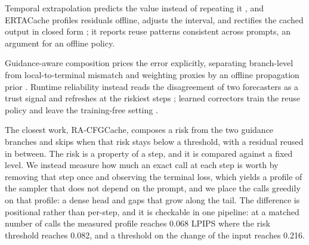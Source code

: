 Temporal extrapolation predicts the value instead of repeating it \citep{liu2025taylorseer}, and ERTACache profiles residuals offline, adjusts the interval, and rectifies the cached output in closed form \citep{peng2025ertacache}; it reports reuse patterns consistent across prompts, an argument for an offline policy.

Guidance-aware composition prices the error explicitly, separating branch-level from local-to-terminal mismatch and weighting proxies by an offline propagation prior \citep{liu2026racfgcache}. Runtime reliability instead reads the disagreement of two forecasters as a trust signal and refreshes at the riskiest steps \citep{li2026racer}; learned correctors train the reuse policy and leave the training-free setting \citep{ma2024learning}.

The closest work, RA-CFGCache, composes a risk from the two guidance branches and skips when that risk stays below a threshold, with a residual reused in between. The risk is a property of a step, and it is compared against a fixed level. We instead measure how much an exact call at each step is worth by removing that step once and observing the terminal loss, which yields a profile of the sampler that does not depend on the prompt, and we place the calls greedily on that profile: a dense head and gaps that grow along the tail. The difference is positional rather than per-step, and it is checkable in one pipeline: at a matched number of calls the measured profile reaches 0.068 LPIPS where the risk threshold reaches 0.082, and a threshold on the change of the input reaches 0.216.
